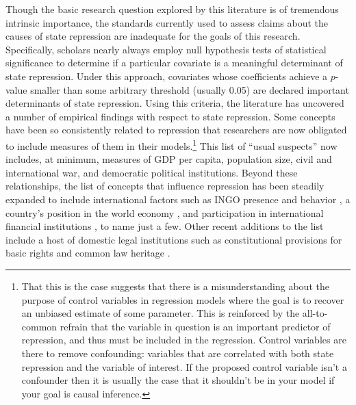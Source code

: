 \documentclass[11pt]{article}
\begin{document}
Though the basic research question explored by this literature is of tremendous intrinsic importance, the standards currently used to assess claims about the causes of state repression are inadequate for the goals of this research. Specifically, scholars nearly always employ null hypothesis tests of statistical significance to determine if a particular covariate is a meaningful determinant of state repression. Under this approach, covariates whose coefficients achieve a $p$-value smaller than some arbitrary threshold (usually 0.05) are declared important determinants of state repression. Using this criteria, the literature has uncovered a number of empirical findings with respect to state repression. Some concepts have been so consistently related to repression that researchers are now obligated to include measures of them in their models.\footnote{That this is the case suggests that there is a misunderstanding about the purpose of control variables in regression models where the goal is to recover an unbiased estimate of some parameter. This is reinforced by the all-to-common refrain that the variable in question is an important predictor of repression, and thus must be included in the regression. Control variables are there to remove confounding: variables that are correlated with both state repression and the variable of interest. If the proposed control variable isn't a confounder then it is usually the case that it shouldn't be in your model if your goal is causal inference.} This list of ``usual suspects'' now includes, at minimum, measures of GDP per capita, population size, civil and international war, and democratic political institutions. Beyond these relationships, the list of concepts that influence repression has been steadily expanded to include international factors such as INGO presence and behavior \citep{HafnerBurtonTsutsui2005, Franklin2008, MurdieDavis2012}, a country's position in the world economy \citep{HafnerBurton2005jpr}, and participation in international financial institutions \citep{AbouharbCingranelli2006, AbouharbCingranelli2007}, to name just a few. Other recent additions to the list include a host of domestic legal institutions such as constitutional provisions for basic rights \citep{Cross1999, KeithTatePoe2009} and common law heritage \citep{Mitchell2013}. 
\end{document}
